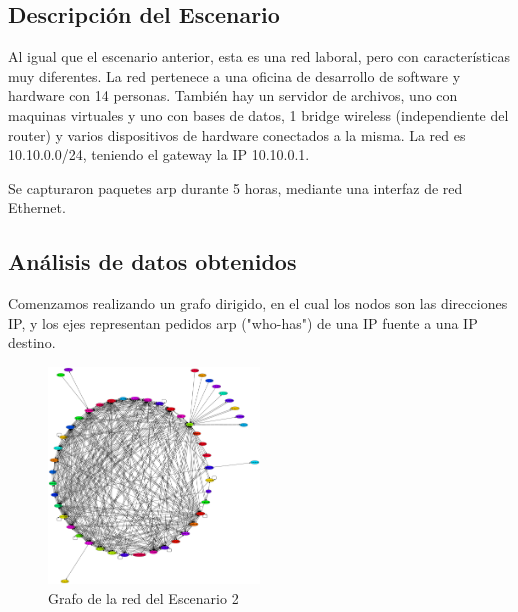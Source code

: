 \subsection{Descripci\'on del Escenario}
	\par Al igual que el escenario anterior, esta es una red laboral, pero con características muy diferentes. La red pertenece a una oficina de desarrollo de software y hardware con 14 personas. También hay un servidor de archivos, uno con maquinas virtuales y uno con bases de datos, 1 bridge wireless (independiente del router) y varios dispositivos de hardware conectados a la misma. La red es 10.10.0.0/24, teniendo el gateway la IP 10.10.0.1. 
     \par Se capturaron paquetes arp durante 5 horas, mediante una interfaz de red Ethernet.
     
\subsection{An\'alisis de datos obtenidos}
	\par Comenzamos realizando un grafo dirigido, en el cual los nodos son las direcciones IP, y los ejes representan pedidos arp ("who-has") de una IP fuente a una IP destino.
	\begin{figure}[!ht]
		\centering
		\includegraphics[width=0.5\textwidth]{img/graph/escenario_2/grafico_de_la_red.eps}
		\caption{Grafo de la red del Escenario 2}
		\label{fig:grafo_escenario2}
	\end{figure}
    
